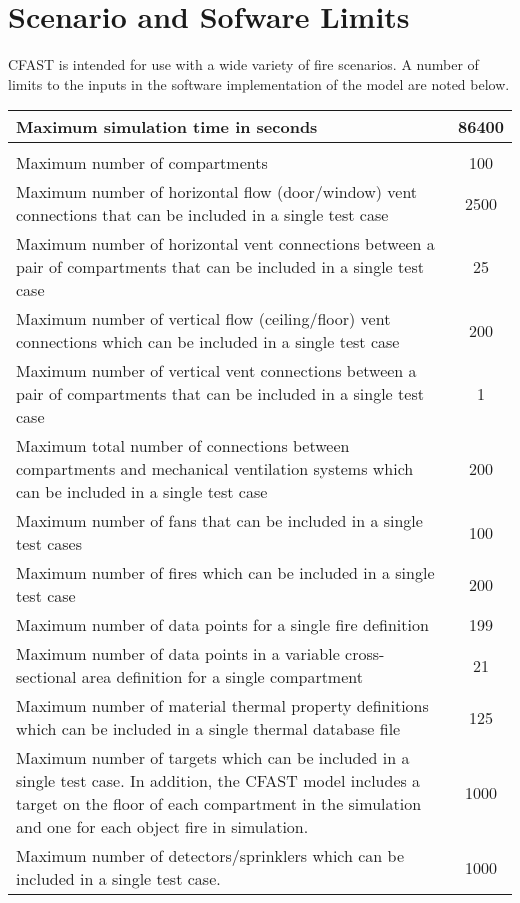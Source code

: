 \chapter{Scenario and Sofware Limits}

CFAST is intended for use with a wide variety of fire scenarios.  A number of limits to the inputs in the software implementation of the model are noted below.


\begin{center}
\begin{tabular}{|p{15cm}|c|}
\hline
Maximum simulation time in seconds & 86400 \\ \hline

\\ \hline

Maximum number of compartments & 100 \\ \hline
Maximum number of horizontal flow (door/window) vent connections that can be included in a single test case & 2500 \\ \hline
Maximum number of horizontal vent connections between a pair of compartments that can be included in a single test case & 25 \\ \hline
Maximum number of vertical flow (ceiling/floor) vent connections which can be included in a single test case & 200 \\ \hline
Maximum number of vertical vent connections between a pair of compartments that can be included in a single test case & 1 \\ \hline
Maximum total number of connections between compartments and mechanical ventilation systems which can be included in a single test case & 200 \\ \hline
Maximum number of fans that can be included in a single test cases  & 100 \\ \hline

Maximum number of fires which can be included in a single test case & 200 \\ \hline
Maximum number of data points for a single  fire definition & 199 \\ \hline
Maximum number of data points in a variable cross-sectional area definition for a single compartment & 21 \\ \hline
Maximum number of material thermal property definitions which can be included in a single thermal database file & 125 \\ \hline

Maximum number of targets which can be included in a single test case. In addition, the CFAST model includes a target on the floor of each compartment in the simulation and one for each object fire in simulation. & 1000 \\ \hline
Maximum number of detectors/sprinklers which can be included in a single test case. & 1000 \\ \hline

\hline
\end{tabular}
\end{center} 